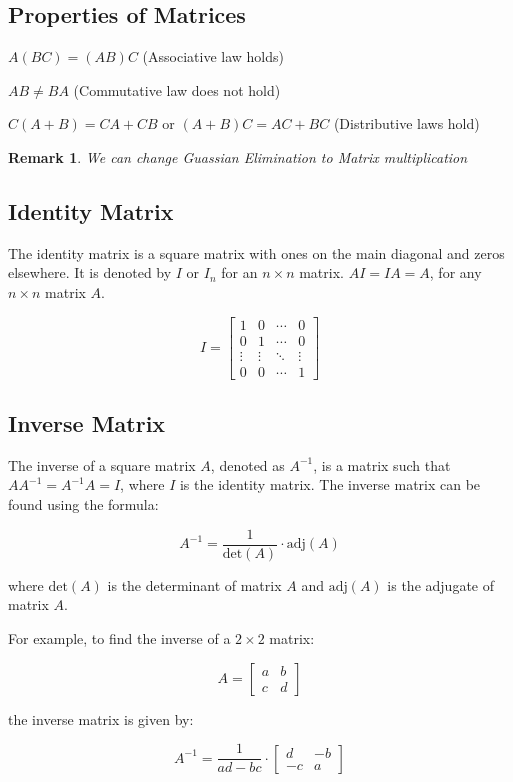 \documentclass[12pt,a4paper]{article}
\newtheorem*{rem}{Remark}
\newcommand{\Remark}[1]{
  \begin{rem}
    \color{cyan}
    #1
  \end{rem}
}
\begin{document}
\subsection*{Properties of Matrices}

$A(BC) = (AB)C$ (Associative law holds)

$AB \neq BA$ (Commutative law does not hold)

$C(A+B) = CA + CB$ or $(A+B)C = AC + BC$ (Distributive laws hold)

\Remark{We can change Guassian Elimination to Matrix multiplication}

\subsection*{Identity Matrix}
The identity matrix is a square matrix with ones on the main diagonal and zeros elsewhere. 
It is denoted by $I$ or $I_n$ for an $n \times n$ matrix.
$AI = IA = A$, for any $n \times n$ matrix $A$.

\[
I = \begin{bmatrix}
1 & 0 & \cdots & 0 \\
0 & 1 & \cdots & 0 \\
\vdots & \vdots & \ddots & \vdots \\
0 & 0 & \cdots & 1
\end{bmatrix}
\]


\subsection*{Inverse Matrix}
The inverse of a square matrix $A$, denoted as $A^{-1}$, is a matrix such that $AA^{-1} = A^{-1}A = I$, where $I$ is the identity matrix. The inverse matrix can be found using the formula:

\[
A^{-1} = \frac{1}{{\text{det}(A)}} \cdot \text{adj}(A)
\]

where $\text{det}(A)$ is the determinant of matrix $A$ and $\text{adj}(A)$ is the adjugate of matrix $A$.

For example, to find the inverse of a $2 \times 2$ matrix:

\[
A = \begin{bmatrix}
a & b \\
c & d
\end{bmatrix}
\]

the inverse matrix is given by:

\[
A^{-1} = \frac{1}{{ad - bc}} \cdot \begin{bmatrix}
d & -b \\
-c & a
\end{bmatrix}
\]
\end{document}
